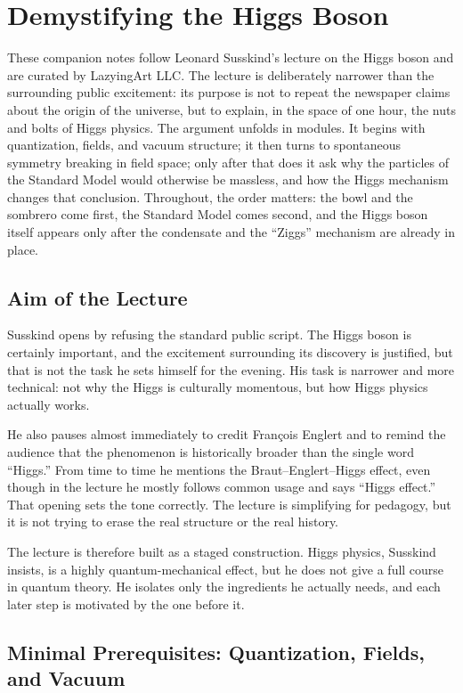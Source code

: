 \chapter{Demystifying the Higgs Boson}

These companion notes follow Leonard Susskind's lecture on the Higgs boson and are curated by LazyingArt LLC. The lecture is deliberately narrower than the surrounding public excitement: its purpose is not to repeat the newspaper claims about the origin of the universe, but to explain, in the space of one hour, the nuts and bolts of Higgs physics. The argument unfolds in modules. It begins with quantization, fields, and vacuum structure; it then turns to spontaneous symmetry breaking in field space; only after that does it ask why the particles of the Standard Model would otherwise be massless, and how the Higgs mechanism changes that conclusion. Throughout, the order matters: the bowl and the sombrero come first, the Standard Model comes second, and the Higgs boson itself appears only after the condensate and the ``Ziggs'' mechanism are already in place.

\section{Aim of the Lecture}

Susskind opens by refusing the standard public script. The Higgs boson is certainly important, and the excitement surrounding its discovery is justified, but that is not the task he sets himself for the evening. His task is narrower and more technical: not why the Higgs is culturally momentous, but how Higgs physics actually works.

He also pauses almost immediately to credit Fran\c{c}ois Englert and to remind the audience that the phenomenon is historically broader than the single word ``Higgs.'' From time to time he mentions the Braut--Englert--Higgs effect, even though in the lecture he mostly follows common usage and says ``Higgs effect.'' That opening sets the tone correctly. The lecture is simplifying for pedagogy, but it is not trying to erase the real structure or the real history.

The lecture is therefore built as a staged construction. Higgs physics, Susskind insists, is a highly quantum-mechanical effect, but he does not give a full course in quantum theory. He isolates only the ingredients he actually needs, and each later step is motivated by the one before it.

\section{Minimal Prerequisites: Quantization, Fields, and Vacuum}

